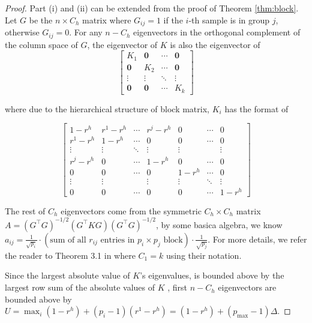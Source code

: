 \begin{proof}
    Part (i) and (ii) can be extended from the proof of Theorem \ref{thm:block}. Let $G$ be the $n \times C_h$ matrix where $G_{ij} = 1$ if the $i$-th sample is in group $j$, otherwise $G_{ij} = 0$. For any $n - C_h$ eigenvectors in the orthogonal complement of the column space of $G$, the eigenvector of $K$ is also the eigenvector of 
\begin{equation*}
    \begin{bmatrix}
    K_1 & \mathbf{0} & \cdots & \mathbf{0} \\
    \mathbf{0} & K_2 & \cdots & \mathbf{0} \\
    \vdots & \vdots & \ddots & \vdots \\
    \mathbf{0} & \mathbf{0} & \cdots & K_k
    \end{bmatrix}
\end{equation*}

    where due to the hierarchical structure of block matrix, $K_i$ has the format of 

\begin{equation*}
    \begin{bmatrix}
1 - r^h & r^1 - r^h & \cdots & r^j - r^h & 0 & \cdots & 0 \\
r^1 - r^h & 1 - r^h & \cdots & 0 & 0 & \cdots & 0 \\
\vdots & \vdots & \ddots & \vdots & \vdots & & \vdots \\
r^j - r^h & 0 & \cdots & 1 - r^h & 0 & \cdots & 0 \\
0 & 0 & \cdots & 0 & 1 - r^h & \cdots & 0 \\
\vdots & \vdots & & \vdots & \vdots & \ddots & \vdots \\
0 & 0 & \cdots & 0 & 0 & \cdots & 1 - r^h
\end{bmatrix}
\end{equation*}

    The rest of $C_h$ eigenvectors come from the symmetric $C_h \times C_h$ matrix $A = (G^\top G)^{-1/2}(G^\top KG)(G^\top G)^{-1/2}$, by some basica algebra, we know $a_{ij} = \frac{1}{\sqrt{p_i}} \cdot (\text{sum of all } r_{ij} \text{ entries in } p_i \times p_j \text{ block}) \cdot \frac{1}{\sqrt{p_j}}$. For more details, we refer the reader to Theorem 3.1 in \citet{Cadima_Calheiros_Preto_2010} where $C_1 = k$ using their notation.

    Since the largest absolute value of $K$'s eigenvalues, is bounded above by the largest row sum of the absolute values of $K$ \citep{Horn_Johnson_2012}, first $n - C_h$ eigenvectors are bounded above by $U = \max_{i}(1 - r^h)+(p_i - 1)(r^1 - r^h) = (1 - r^h) + (p_\text{max} - 1)\Delta$.


\end{proof}
